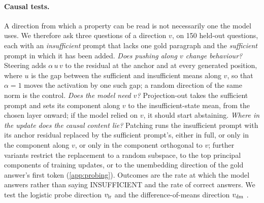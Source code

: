 \paragraph{Causal tests.}
A direction from which a property can be read is not necessarily one the model uses. We therefore ask three questions of a direction $v$, on 150 held-out questions, each with an \emph{insufficient} prompt that lacks one gold paragraph and the \emph{sufficient} prompt in which it has been added. \emph{Does pushing along $v$ change behaviour?} Steering adds $\alpha\,u\,v$ to the residual at the anchor and at every generated position, where $u$ is the gap between the sufficient and insufficient means along $v$, so that $\alpha=1$ moves the activation by one such gap; a random direction of the same norm is the control. \emph{Does the model need $v$?} Projection-out takes the sufficient prompt and sets its component along $v$ to the insufficient-state mean, from the chosen layer onward; if the model relied on $v$, it should start abstaining. \emph{Where in the update does the causal content lie?} Patching runs the insufficient prompt with its anchor residual replaced by the sufficient prompt's, either in full, or only in the component along $v$, or only in the component orthogonal to $v$; further variants restrict the replacement to a random subspace, to the top principal components of training updates, or to the unembedding direction of the gold answer's first token (\cref{app:probing}). Outcomes are the rate at which the model answers rather than saying INSUFFICIENT and the rate of correct answers. We test the logistic probe direction $v_{\mathrm{lr}}$ and the difference-of-means direction $v_{\mathrm{dm}}$ \cite{marks2023geometry,ActivationSteering,meng2022locating}.
